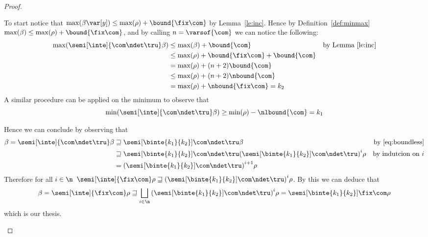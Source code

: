 \begin{proof}
\begin{inductive}
\begin{description}
      To start notice that
      \(\max(\beta\var[y]) \leq \max(\rho) + \bound{\fix\com}\) by
      Lemma~\ref{le:inc}. Hence by Definition~\ref{def:minmax}
      \(\max(\beta) \leq \max(\rho) + \bound{\fix\com}\), and by
      calling \(n = \varsof{\com}\) we can notice the following:
      \begin{align*}
        \max(\semi[\inte]{\com\ndet\tru}\beta) & \leq \max(\beta) + \bound{\com} & \text{by Lemma~\ref{le:inc}}\\
                                               & \leq \max(\rho) + \bound{\fix\com} + \bound{\com} \\
                                               & = \max(\rho) + (n+2)\bound{\com} \\
                                               & \leq \max(\rho) + (n+2)\nbound{\com} \\
                                               & = \max(\rho) + \nbound{\fix\com} = k_2
      \end{align*}
      A similar procedure can be applied on the minimum to observe
      that
      \[\min(\semi[\inte]{\com\ndet\tru}\beta) \geq \min(\rho) -
        \nlbound{\com}= k_1\]

      Hence we can conclude by observing that
      \begin{align*}
        \beta = \semi[\inte]{\com\ndet\tru}\beta & \sqsupseteq \semi[\binte{k_1}{k_2}]{\com\ndet\tru}\beta  & \text{by~\eqref{eq:boundless}}\\
                                                 & \sqsupseteq \semi[\binte{k_1}{k_2}]{\com\ndet\tru}{\left(\semi[\binte{k_1}{k_2}]{\com\ndet\tru}\right)}^i\rho & \text{by indutcion on } i \\
        & = {\left(\semi[\binte{k_1}{k_2}]{\com\ndet\tru}\right)}^{i+1}\rho
      \end{align*}
      Therefore for all \(i\in\n\)
      \(\semi[\inte]{\fix\com}\rho \sqsupseteq
      {\left(\semi[\binte{k_1}{k_2}]{\com\ndet\tru}\right)}^{i}\rho\). By
      this we can deduce that
      \begin{equation*}
        \beta = \semi[\inte]{\fix\com}\rho \sqsupseteq \bigsqcup_{i\in\n}{\left(\semi[\binte{k_1}{k_2}]{\com\ndet\tru}\right)}^i\rho = \semi[\binte{k_1}{k_2}]{\fix\com}\rho
      \end{equation*}
      which is our thesis.
    \end{description}
  \end{inductive}
\end{proof}

